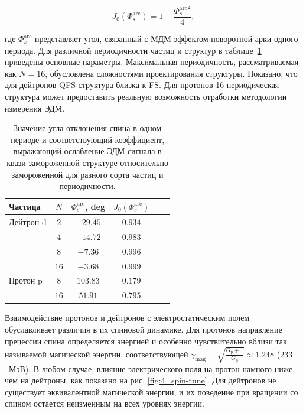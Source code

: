 \begin{equation}
	J_{0}(\Phi_s^{\textrm{arc}})=1-\frac{{\Phi_s^{\textrm{arc}}}^2}{4},
	\label{eq:edm}
\end{equation}

\noindent где $\Phi_s^{\textrm{arc}}$ представляет угол, связанный с МДМ-эффектом поворотной арки одного периода. Для различной периодичности частиц и структур в таблице~\ref{tab:edm} приведены основные параметры. Максимальная периодичность, рассматриваемая как $N=16$, обусловлена сложностями проектирования структуры. Показано, что для дейтронов QFS структура близка к FS. Для протонов 16-периодическая структура может предоставить реальную возможность отработки методологии измерения ЭДМ.

\begin{table}[!htb]
	\centering
	\caption{Значение угла отклонения спина в одном периоде и соответствующий коэффициент, выражающий ослабление ЭДМ-сигнала в квази-замороженной структуре относительно замороженной для разного сорта частиц и периодичности.}
	\label{tab:edm}
	\begin{tabular*}{8cm} {@{\extracolsep{\fill} } lccccc}
		\toprule
		Частица & $N$ & $\Phi_s^{\textrm{arc}}$, deg & $J_{0}(\Phi_s^{\textrm{arc}})$ \\
		\midrule
		Дейтрон $\text{d}$ & $2$   & $-29.45$ & $0.934$ \\
		& $4$   & $-14.72$ & $0.983$ \\
		& $8$   & $-7.36$ & $0.996$ \\
		& $16$   & $-3.68$ & $0.999$ \\
		Протон $\text{p}$ & $8$  &  $103.83$	& $0.179$\\
		& $16$  &  $51.91$	   & $0.795$\\
		\bottomrule
	\end{tabular*}
\end{table}

\par Взаимодействие протонов и дейтронов с электростатическим полем обуславливает различия в их спиновой динамике. Для протонов направление прецессии спина определяется энергией и особенно чувствительно вблизи так называемой магической энергии, соответствующей $\gamma_{\text{mag}} = \sqrt{\frac{G_{\text{p}}+1}{G_{\text{p}}}} \approx 1.248$ ($233$~МэВ). В любом случае, влияние электрического поля на протон намного ниже, чем на дейтроны, как показано на рис. \ref{fig:4_spin-tune}. Для дейтронов не существует эквивалентной магической энергии, и их поведение при вращении со спином остается неизменным на всех уровнях энергии.

